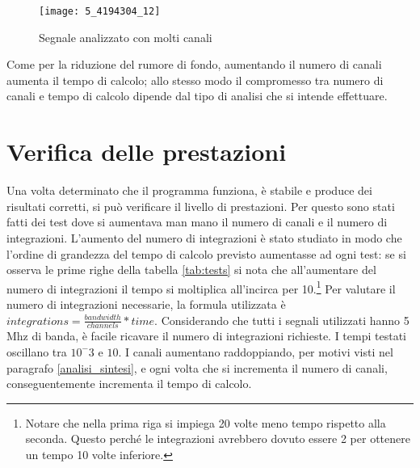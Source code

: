 \begin{figure}[htb]
	\begin{center}
		\texttt{[image: 5\_4194304\_12]}
	\end{center}
	\caption{Segnale analizzato con molti canali}
	\label{fig:high_chans}
\end{figure}

Come per la riduzione del rumore di fondo, aumentando il numero di canali
aumenta il tempo di calcolo; allo stesso modo il compromesso tra numero di
canali e tempo di calcolo dipende dal tipo di analisi che si intende effettuare.

\section{Verifica delle prestazioni}

Una volta determinato che il programma funziona, \`e stabile e produce dei
risultati corretti, si pu\`o verificare il livello di prestazioni. Per questo
sono stati fatti dei test dove si aumentava man mano il numero di canali e il
numero di integrazioni. L'aumento del numero di integrazioni \`e stato studiato
in modo che l'ordine di grandezza del tempo di calcolo previsto aumentasse ad
ogni test: se si osserva le prime righe della tabella \ref{tab:tests} si nota
che all'aumentare del numero di integrazioni il tempo si moltiplica all'incirca
per 10.\footnote{Notare che nella prima riga si impiega 20 volte meno tempo
    rispetto alla seconda. Questo perch\'e le integrazioni avrebbero dovuto
    essere 2 per ottenere un tempo 10 volte inferiore.}
Per valutare il numero di integrazioni necessarie, la formula utilizzata \`e
$integrations = \frac{bandwidth}{channels} * time$. Considerando che tutti i
segnali utilizzati hanno 5 Mhz di banda, \`e facile ricavare il numero di
integrazioni richieste. I tempi testati oscillano tra $10^-3$ e $10$.
I canali aumentano raddoppiando, per motivi visti nel paragrafo
\ref{analisi_sintesi}, e ogni volta che si incrementa il numero di canali,
conseguentemente incrementa il tempo di calcolo.


